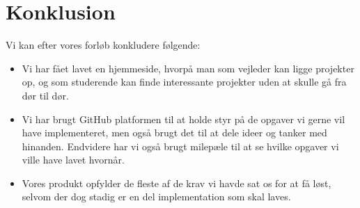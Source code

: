 \documentclass[12pt]{article}
\begin{document}
\section{Konklusion}
\label{sec:konklusion}
Vi kan efter vores forløb konkludere følgende:
\begin{itemize}
\item Vi har fået lavet en hjemmeside, hvorpå man som vejleder kan ligge projekter op, og som studerende kan finde interessante projekter uden at skulle gå fra dør til dør.
\item Vi har brugt GitHub platformen til at holde styr på de opgaver vi gerne vil have implementeret, men også brugt det til at dele ideer og tanker med hinanden. Endvidere har vi også brugt milepæle til at se hvilke opgaver vi ville have lavet hvornår.
\item Vores produkt opfylder de fleste af de krav vi havde sat os for at få løst, selvom der dog stadig er en del implementation som skal laves.
\end{itemize}
\end{document}
